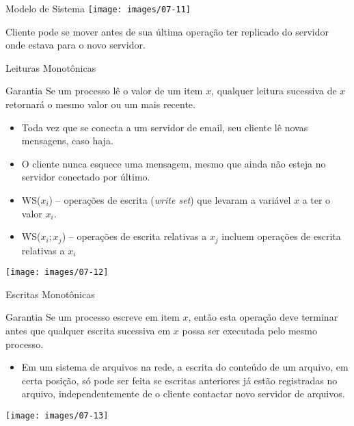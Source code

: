 \begin{frame}{Modelo de Sistema}
\texttt{[image: images/07-11]}

Cliente pode se mover antes de sua última operação ter replicado do servidor onde estava para o novo servidor.
\end{frame}

\begin{frame}[allowframebreaks]{Leituras Monotônicas}
\begin{block}{Garantia}
	Se um processo lê o valor de um item $x$, qualquer leitura sucessiva de $x$ retornará o mesmo valor ou um mais recente.
\end{block}
\begin{itemize}
	\item Toda vez que se conecta a um servidor de email, seu cliente lê novas mensagens, caso haja.
	\item O cliente nunca esquece uma mensagem, mesmo que ainda não esteja no servidor conectado por último.
\end{itemize}

\framebreak

\begin{itemize}
	\item WS($x_i$) -- operações de escrita (\emph{write set}) que levaram a variável $x$ a ter o valor $x_i$.
	\item WS($x_i;x_j$) -- operações de escrita relativas a $x_j$ incluem operações de escrita relativas a $x_i$
\end{itemize}

\texttt{[image: images/07-12]}

\end{frame}


\begin{frame}{Escritas Monotônicas}
\begin{block}{Garantia}
	Se um processo escreve em item $x$, então esta operação deve terminar antes que qualquer escrita sucessiva em $x$ possa ser executada pelo mesmo processo.
\end{block}
\begin{itemize}
	\item Em um sistema de arquivos na rede, a escrita do conteúdo de um arquivo, em certa posição, só pode ser feita se escritas anteriores já estão registradas no arquivo, independentemente de o cliente contactar novo servidor de arquivos.
\end{itemize}


\texttt{[image: images/07-13]}

\end{frame}



